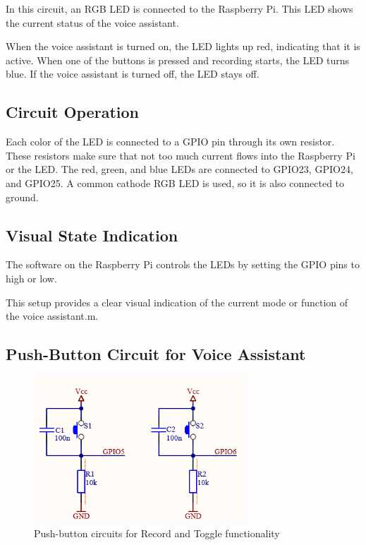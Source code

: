 In this circuit, an RGB LED is connected to the Raspberry Pi. This LED shows the current status of the voice assistant.

When the voice assistant is turned on, the LED lights up red, indicating that it is active. When one of the buttons is pressed and recording starts, the LED turns blue. If the voice assistant is turned off, the LED stays off.

\subsection*{Circuit Operation}

Each color of the LED is connected to a GPIO pin through its own resistor. These resistors make sure that not too much current flows into the Raspberry Pi or the LED. The red, green, and blue LEDs are connected to GPIO23, GPIO24, and GPIO25. A common cathode RGB LED is used, so it is also connected to ground.

\subsection*{Visual State Indication}

The software on the Raspberry Pi controls the LEDs by setting the GPIO pins to high or low.

This setup provides a clear visual indication of the current mode or function of the voice assistant.m.

\newpage

\subsection{Push-Button Circuit for Voice Assistant}

\begin{figure}[h]
\centering
\includegraphics[width=0.7\textwidth]{assets/Schalter}
\caption{Push-button circuits for Record and Toggle functionality}
\label{fig:push_buttons}
\end{figure}

